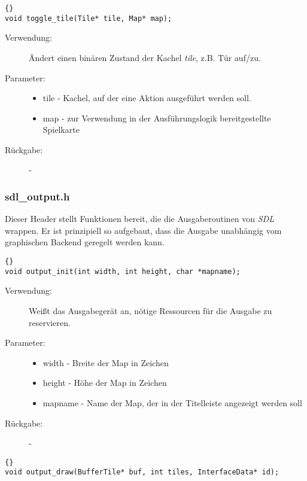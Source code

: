 \documentclass[11pt,a4paper,notitlepage]{report}
\begin{document}
		\begin{lstlisting}[caption=toggle\_tile]{}
void toggle_tile(Tile* tile, Map* map);
		\end{lstlisting}
		
	\begin{description}
		\item[Verwendung:] Ändert einen binären Zustand der Kachel \textit{tile}, z.B. Tür auf/zu.
		\item[Parameter:] \hfill
		\begin{itemize}
			\item tile - Kachel, auf der eine Aktion ausgeführt werden soll.
			\item map - zur Verwendung in der Ausführungslogik bereitgestellte Spielkarte
		\end{itemize}
		\item[Rückgabe:] -
	\end{description}

	\newpage
	\subsubsection*{sdl\_output.h}
	Dieser Header stellt Funktionen bereit, die die Ausgaberoutinen von \textit{SDL} wrappen. Er ist prinzipiell so aufgebaut, dass die Ausgabe unabhängig vom graphischen Backend geregelt werden kann.
	
		\begin{lstlisting}[caption=output\_init]{}
void output_init(int width, int height, char *mapname);
		\end{lstlisting}
		
	\begin{description}
		\item[Verwendung:] Weißt das Ausgabegerät an, nötige Ressourcen für die Ausgabe zu reservieren.
		\item[Parameter:] \hfill
		\begin{itemize}
			\item width - Breite der Map in Zeichen
			\item height - Höhe der Map in Zeichen
			\item mapname - Name der Map, der in der Titelleiste angezeigt werden soll
		\end{itemize}
		\item[Rückgabe:] -
	\end{description}
	
		\begin{lstlisting}[caption=output\_draw]{}
void output_draw(BufferTile* buf, int tiles, InterfaceData* id);
		\end{lstlisting}
		
\end{document}
